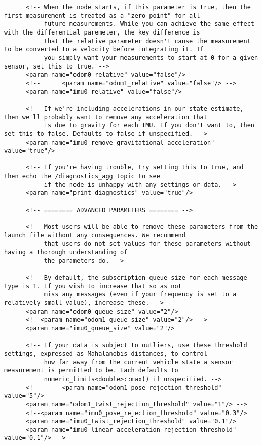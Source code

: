 \begin{verbatim}
      <!-- When the node starts, if this parameter is true, then the first measurement is treated as a "zero point" for all
           future measurements. While you can achieve the same effect with the differential paremeter, the key difference is
           that the relative parameter doesn't cause the measurement to be converted to a velocity before integrating it. If
           you simply want your measurements to start at 0 for a given sensor, set this to true. -->
      <param name="odom0_relative" value="false"/>
      <!--      <param name="odom1_relative" value="false"/> -->
      <param name="imu0_relative" value="false"/>

      <!-- If we're including accelerations in our state estimate, then we'll probably want to remove any acceleration that
           is due to gravity for each IMU. If you don't want to, then set this to false. Defaults to false if unspecified. -->
      <param name="imu0_remove_gravitational_acceleration" value="true"/>

      <!-- If you're having trouble, try setting this to true, and then echo the /diagnostics_agg topic to see
           if the node is unhappy with any settings or data. -->
      <param name="print_diagnostics" value="true"/>

      <!-- ======== ADVANCED PARAMETERS ======== -->

      <!-- Most users will be able to remove these parameters from the launch file without any consequences. We recommend
           that users do not set values for these parameters without having a thorough understanding of
           the parameters do. -->

      <!-- By default, the subscription queue size for each message type is 1. If you wish to increase that so as not
           miss any messages (even if your frequency is set to a relatively small value), increase these. -->
      <param name="odom0_queue_size" value="2"/>
      <!--<param name="odom1_queue_size" value="2"/> -->
      <param name="imu0_queue_size" value="2"/>

      <!-- If your data is subject to outliers, use these threshold settings, expressed as Mahalanobis distances, to control
           how far away from the current vehicle state a sensor measurement is permitted to be. Each defaults to
           numeric_limits<double>::max() if unspecified. -->
      <!--      <param name="odom1_pose_rejection_threshold" value="5"/>
      <param name="odom1_twist_rejection_threshold" value="1"/> -->
      <!--<param name="imu0_pose_rejection_threshold" value="0.3"/>
      <param name="imu0_twist_rejection_threshold" value="0.1"/>
      <param name="imu0_linear_acceleration_rejection_threshold" value="0.1"/> -->


\end{verbatim}
